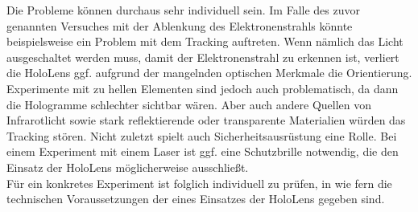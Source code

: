 Die Probleme können durchaus sehr individuell sein. Im Falle des zuvor genannten Versuches mit der Ablenkung des Elektronenstrahls könnte beispielsweise ein Problem mit dem Tracking auftreten. Wenn nämlich das Licht ausgeschaltet werden muss, damit der Elektronenstrahl zu erkennen ist, verliert die HoloLens ggf. aufgrund der mangelnden optischen Merkmale die Orientierung. Experimente mit zu hellen Elementen sind jedoch auch problematisch, da dann die Hologramme schlechter sichtbar wären. Aber auch andere Quellen von Infrarotlicht sowie stark reflektierende oder transparente Materialien würden das Tracking stören. Nicht zuletzt spielt auch Sicherheitsausrüstung eine Rolle. Bei einem Experiment mit einem Laser ist ggf. eine Schutzbrille notwendig, die den Einsatz der HoloLens möglicherweise ausschließt.\\

Für ein konkretes Experiment ist folglich individuell zu prüfen, in wie fern die technischen Voraussetzungen der eines Einsatzes der HoloLens gegeben sind.
	
	
	
	
	
	
	
	
	
	
	